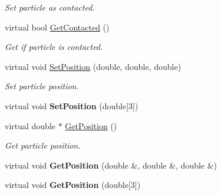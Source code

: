 \begin{DoxyCompactItemize}
\begin{DoxyCompactList}\small\item\em Set particle as contacted. \item\end{DoxyCompactList}\item 
\hypertarget{classvtkParticle_ae38c91bdcf9130afee18190aa57d58e5}{
virtual bool \hyperlink{classvtkParticle_ae38c91bdcf9130afee18190aa57d58e5}{GetContacted} ()}
\label{classvtkParticle_ae38c91bdcf9130afee18190aa57d58e5}

\begin{DoxyCompactList}\small\item\em Get if particle is contacted. \item\end{DoxyCompactList}\item 
\hypertarget{classvtkParticle_a5c578dfba85738c607b5e876f0fdefb8}{
virtual void \hyperlink{classvtkParticle_a5c578dfba85738c607b5e876f0fdefb8}{SetPosition} (double, double, double)}
\label{classvtkParticle_a5c578dfba85738c607b5e876f0fdefb8}

\begin{DoxyCompactList}\small\item\em Set particle position. \item\end{DoxyCompactList}\item 
\hypertarget{classvtkParticle_a7dd8ded2eeb5f47a1035fb6401893fe3}{
virtual void {\bfseries SetPosition} (double\mbox{[}3\mbox{]})}
\label{classvtkParticle_a7dd8ded2eeb5f47a1035fb6401893fe3}

\item 
\hypertarget{classvtkParticle_a1ef3dcc52852dca8f7a52b301d3bbf8c}{
virtual double $\ast$ \hyperlink{classvtkParticle_a1ef3dcc52852dca8f7a52b301d3bbf8c}{GetPosition} ()}
\label{classvtkParticle_a1ef3dcc52852dca8f7a52b301d3bbf8c}

\begin{DoxyCompactList}\small\item\em Get particle position. \item\end{DoxyCompactList}\item 
\hypertarget{classvtkParticle_a3d49f434012548c1191c5cb4a86d294a}{
virtual void {\bfseries GetPosition} (double \&, double \&, double \&)}
\label{classvtkParticle_a3d49f434012548c1191c5cb4a86d294a}

\item 
\hypertarget{classvtkParticle_a4702b1601ad5b9b2e12b48b2f1818ee9}{
virtual void {\bfseries GetPosition} (double\mbox{[}3\mbox{]})}
\label{classvtkParticle_a4702b1601ad5b9b2e12b48b2f1818ee9}


\end{DoxyCompactItemize}
